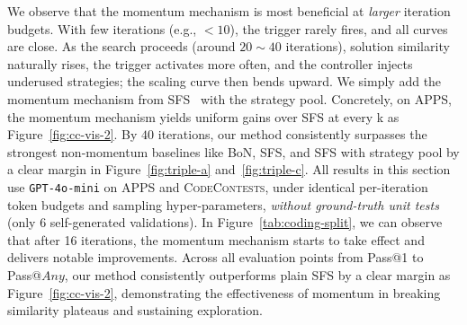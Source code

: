 \documentclass{article} %
\theoremstyle{definition}
\theoremstyle{remark}
\begin{document}
We observe that the momentum mechanism is most beneficial at \emph{larger} iteration budgets. With few iterations (e.g., $<\!10$), the trigger rarely fires, and all curves are close. 
As the search proceeds (around $20{\sim}40$ iterations), solution similarity naturally rises, the trigger activates more often, and the controller injects underused strategies; the scaling curve then bends upward. We simply add the momentum mechanism from SFS~\citep{light2025sfs} with the strategy pool. Concretely, on APPS, the momentum mechanism yields uniform gains over SFS at every k as Figure~\ref{fig:cc-vis-2}. By $40$ iterations, our method consistently surpasses the strongest non-momentum baselines like BoN, SFS, and SFS with strategy pool by a clear margin in Figure~\ref{fig:triple-a} and~\ref{fig:triple-c}.  All results in this section use \texttt{GPT-4o-mini} on \textsc{APPS} and \textsc{CodeContests}, under identical per-iteration token budgets and sampling hyper-parameters, \emph{without ground-truth unit tests} (only 6 self-generated validations). In Figure~\ref{tab:coding-split},  we can observe that after 16 iterations, the momentum mechanism starts to take effect and delivers notable improvements. Across all evaluation points from Pass@1 to Pass@\!$Any$, our method consistently 
outperforms plain SFS by a clear margin as Figure~\ref{fig:cc-vis-2}, demonstrating the effectiveness of 
momentum in breaking similarity plateaus and sustaining exploration.
\end{document}
